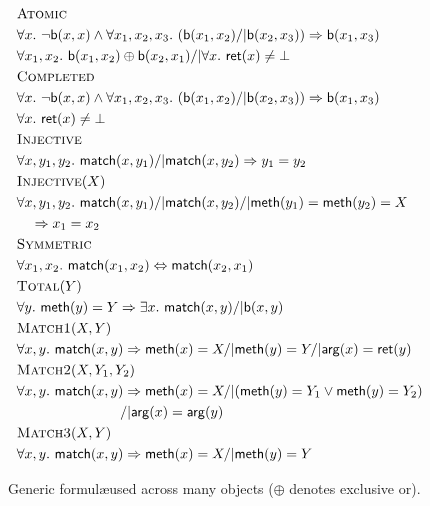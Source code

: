 \begin{figure}
  \footnotesize
  \begin{align*}
    & \textsc{Atomic} \\
    & \forall x.\ \neg {\sf b}(x,x)\land \forall x_1,x_2,x_3.\ ({\sf b}(x_1,x_2) /| {\sf b}(x_2,x_3)) => {\sf b}(x_1,x_3) \\
    & \forall x_1,x_2.\ 
      {\sf b}(x_1,x_2) \oplus {\sf b}(x_2,x_1) /| \forall x.\ {\sf ret}(x) \neq \bot 
    \\
    & \textsc{Completed} \\
    & \forall x.\ \neg {\sf b}(x,x)\land \forall x_1,x_2,x_3.\ ({\sf b}(x_1,x_2) /| {\sf b}(x_2,x_3)) => {\sf b}(x_1,x_3) \\
    & \forall x.\ {\sf ret}(x) \neq \bot
    \\
    & \textsc{Injective} \\
    & \forall x, y_1, y_2.\ {\sf match}(x, y_1) /| {\sf match}(x, y_2) => y_1 = y_2
    \\
    & \textsc{Injective}(X) \\
    & \forall x, y_1, y_2.\ {\sf match}(x, y_1) /| {\sf match}(x, y_2) /| {\sf meth}(y_1)={\sf meth}(y_2)=X \\
    &\quad => x_1 = x_2
    \\
    & \textsc{Symmetric} \\
    & \forall x_1,x_2.\ {\sf match}(x_1,x_2) \Leftrightarrow {\sf match}(x_2,x_1)
    \\
    & \textsc{Total}(Y) \\
    & \forall y.\ {\sf meth}(y) = Y => \exists x.\ {\sf match}(x,y) /| {\sf b}(x,y)
    \\
    & \textsc{Match1}(X,Y) \\
    & \forall x, y.\ {\sf match}(x,y) => 
        {\sf meth}(x) = X /| {\sf meth}(y) = Y /| {\sf arg}(x) = {\sf ret}(y)
    \\
    & \textsc{Match2}(X,Y_1,Y_2) \\
    & \forall x, y.\ {\sf match}(x,y) => 
      {\sf meth}(x) = X /| ({\sf meth}(y) = Y_1 \vee {\sf meth}(y) = Y_2) \\
      & \hspace{2.6cm}/| {\sf arg}(x) = {\sf arg}(y)
    \\
    & \textsc{Match3}(X,Y) \\
      & \forall x, y.\ 
        {\sf match}(x,y) => {\sf meth}(x) = X /| {\sf meth}(y) = Y
  \end{align*}
  \caption{Generic formul\ae used across many objects ($\oplus$ denotes exclusive or).}
  \label{fig:formulas:common}
\end{figure}

